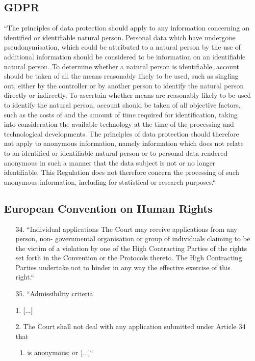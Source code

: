 \documentclass[aps,prb,twocolumn,superscriptaddress,floatfix,longbibliography,nofootinbib]{revtex4-2}
\begin{document}
  \subsection{\label{subsec:GDPR}GDPR}
  ``The principles of data protection should apply to any information concerning an
  identified or identifiable natural person. 
  Personal data which have undergone pseudonymisation, which could be attributed to a natural person by
  the use of additional information should be considered to be information on an identifiable natural person. To
  determine whether a natural person is identifiable, account should be taken of all the means reasonably likely to
  be used, such as singling out, either by the controller or by another person to identify the natural person directly
  or indirectly. To ascertain whether means are reasonably likely to be used to identify the natural person, account
  should be taken of all objective factors, such as the costs of and the amount of time required for identification,
  taking into consideration the available technology at the time of the processing and technological developments.
  The principles of data protection should therefore not apply to anonymous information, namely information
  which does not relate to an identified or identifiable natural person or to personal data rendered anonymous in
  such a manner that the data subject is not or no longer identifiable. This Regulation does not therefore concern
  the processing of such anonymous information, including for statistical or research purposes.`` \cite{GDPR2016}

  \subsection{\label{subsec:ECHR}European Convention on Human Rights}
  \begin{enumerate}
    \item[34.] ``Individual applications
  The Court may receive applications from any person, non-
  governmental organisation or group of individuals claiming to be
  the victim of a violation by one of the High Contracting Parties of
  the rights set forth in the Convention or the Protocols thereto. The
  High Contracting Parties undertake not to hinder in any way the
  effective exercise of this right.``

\item[35.] ``Admissibility criteria
\end{enumerate}
  \begin{enumerate}
    \item[1.] [...]
    \item[2.] The Court shall not deal with any application submitted under Article 34 that
    \begin{enumerate}
      \item is anonymous; or [...]`` \cite{ECHR1950}
    \end{enumerate}
  \end{enumerate}
\end{document}
